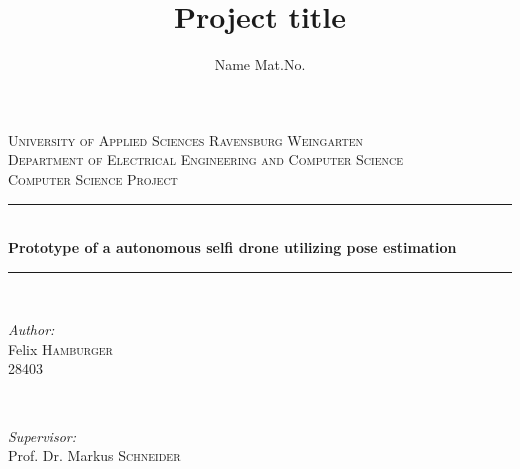\documentclass[a4paper,11pt,singlespacing]{article}
\title{Project title}
\author{
	Name Mat.No.
	}
\begin{document}
\setlength{\parindent}{0ex}


\begin{titlepage}
	
	\newcommand{\HRule}{\rule{\linewidth}{0.5mm}} %
	
	\center %
	
	
	\textsc{\LARGE University of Applied Sciences Ravensburg Weingarten}\\[1.5cm] %
	\textsc{\Large Department of
		Electrical Engineering
		and Computer Science}\\[0.5cm] %
	\textsc{\large Computer Science Project}\\[0.5cm] %
	
	
	\HRule \\[0.4cm]
	{ \huge \bfseries Prototype of a autonomous selfi drone utilizing pose estimation}\\[0.4cm] %
	\HRule \\[1.5cm]
	
	
	\begin{minipage}{0.4\textwidth}
		\begin{flushleft} \large
			\emph{Author:}\\
			Felix \textsc{Hamburger}\\ %
			28403
		\end{flushleft}
	\end{minipage}
	~
	\begin{minipage}{0.4\textwidth}
		\begin{flushright} \large
			\emph{Supervisor:} \\
			Prof. Dr. Markus \textsc{Schneider} %
		\end{flushright}
	\end{minipage}\\[2cm]


\end{titlepage}
\end{document}
